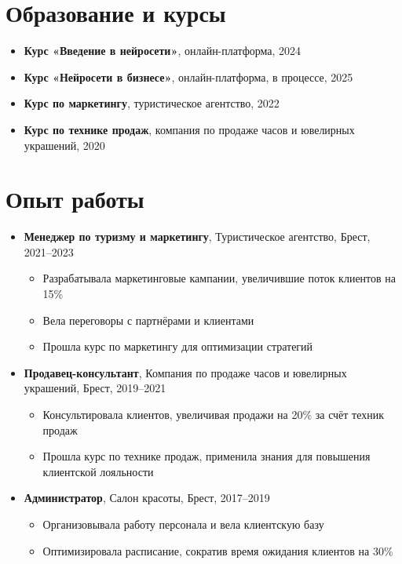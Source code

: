 \documentclass[a4paper,12pt]{article}
\begin{document}
\section{Образование и курсы}
\begin{itemize}
    \item \textbf{Курс «Введение в нейросети»}, онлайн-платформа, 2024
    \item \textbf{Курс «Нейросети в бизнесе»}, онлайн-платформа, в процессе, 2025
    \item \textbf{Курс по маркетингу}, туристическое агентство, 2022
    \item \textbf{Курс по технике продаж}, компания по продаже часов и ювелирных украшений, 2020
\end{itemize}

\section{Опыт работы}
\begin{itemize}
    \item \textbf{Менеджер по туризму и маркетингу}, Туристическое агентство, Брест, 2021--2023
    \begin{itemize}
        \item Разрабатывала маркетинговые кампании, увеличившие поток клиентов на 15\%
        \item Вела переговоры с партнёрами и клиентами
        \item Прошла курс по маркетингу для оптимизации стратегий
    \end{itemize}
    \item \textbf{Продавец-консультант}, Компания по продаже часов и ювелирных украшений, Брест, 2019--2021
    \begin{itemize}
        \item Консультировала клиентов, увеличивая продажи на 20\% за счёт техник продаж
        \item Прошла курс по технике продаж, применила знания для повышения клиентской лояльности
    \end{itemize}
    \item \textbf{Администратор}, Салон красоты, Брест, 2017--2019
    \begin{itemize}
        \item Организовывала работу персонала и вела клиентскую базу
        \item Оптимизировала расписание, сократив время ожидания клиентов на 30\%
    \end{itemize}
\end{itemize}
\end{document}
